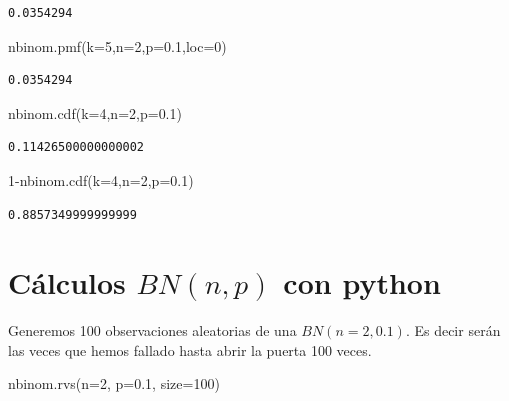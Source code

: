 \documentclass[
  letterpaper,
  DIV=11,
  numbers=noendperiod]{scrreprt}
\newenvironment{Shaded}{\begin{snugshade}}{\end{snugshade}}
\newcommand{\DecValTok}[1]{\textcolor[rgb]{0.68,0.00,0.00}{#1}}
\newcommand{\FloatTok}[1]{\textcolor[rgb]{0.68,0.00,0.00}{#1}}
\newcommand{\NormalTok}[1]{\textcolor[rgb]{0.00,0.23,0.31}{#1}}
\newcommand{\OperatorTok}[1]{\textcolor[rgb]{0.37,0.37,0.37}{#1}}
\begin{document}
\begin{verbatim}
0.0354294
\end{verbatim}

\begin{Shaded}
\begin{Highlighting}[]
\NormalTok{nbinom.pmf(k}\OperatorTok{=}\DecValTok{5}\NormalTok{,n}\OperatorTok{=}\DecValTok{2}\NormalTok{,p}\OperatorTok{=}\FloatTok{0.1}\NormalTok{,loc}\OperatorTok{=}\DecValTok{0}\NormalTok{)}
\end{Highlighting}
\end{Shaded}

\begin{verbatim}
0.0354294
\end{verbatim}

\begin{Shaded}
\begin{Highlighting}[]
\NormalTok{nbinom.cdf(k}\OperatorTok{=}\DecValTok{4}\NormalTok{,n}\OperatorTok{=}\DecValTok{2}\NormalTok{,p}\OperatorTok{=}\FloatTok{0.1}\NormalTok{)}
\end{Highlighting}
\end{Shaded}

\begin{verbatim}
0.11426500000000002
\end{verbatim}

\begin{Shaded}
\begin{Highlighting}[]
\DecValTok{1}\OperatorTok{{-}}\NormalTok{nbinom.cdf(k}\OperatorTok{=}\DecValTok{4}\NormalTok{,n}\OperatorTok{=}\DecValTok{2}\NormalTok{,p}\OperatorTok{=}\FloatTok{0.1}\NormalTok{)}
\end{Highlighting}
\end{Shaded}

\begin{verbatim}
0.8857349999999999
\end{verbatim}

\section{\texorpdfstring{Cálculos \(BN(n,p)\) con
python}{Cálculos BN(n,p) con python}}\label{cuxe1lculos-bnnp-con-python-1}

Generemos 100 observaciones aleatorias de una \(BN(n=2,0.1)\). Es decir
serán las veces que hemos fallado hasta abrir la puerta 100 veces.

\begin{Shaded}
\begin{Highlighting}[]
\NormalTok{nbinom.rvs(n}\OperatorTok{=}\DecValTok{2}\NormalTok{, p}\OperatorTok{=}\FloatTok{0.1}\NormalTok{, size}\OperatorTok{=}\DecValTok{100}\NormalTok{)}
\end{Highlighting}
\end{Shaded}
\end{document}
